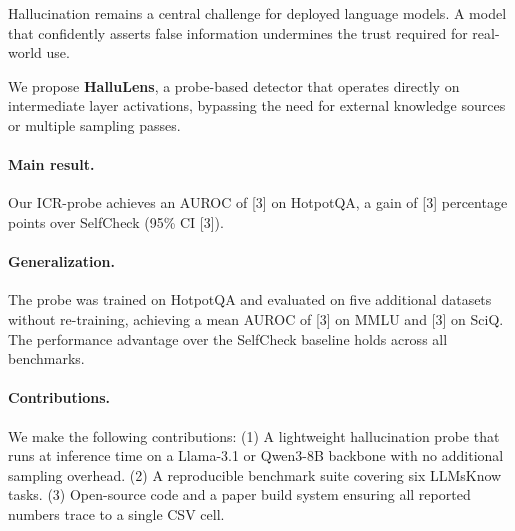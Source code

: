
Hallucination remains a central challenge for deployed language models.
A model that confidently asserts false information undermines the trust
required for real-world use.

We propose \textbf{HalluLens}, a probe-based detector that operates directly
on intermediate layer activations, bypassing the need for external knowledge
sources or multiple sampling passes.

\paragraph{Main result.}
Our ICR-probe achieves an AUROC of
[3]
on HotpotQA, a gain of
[3]
percentage points over SelfCheck (95\% CI
[3]).

\paragraph{Generalization.}
The probe was trained on HotpotQA and evaluated on five additional datasets
without re-training, achieving a mean AUROC of
[3]
on MMLU and
[3]
on SciQ.
The performance advantage over the SelfCheck baseline
holds across all benchmarks.

\paragraph{Contributions.}
We make the following contributions:
(1) A lightweight hallucination probe that runs at inference time on a
    Llama-3.1 or Qwen3-8B backbone with no additional sampling overhead.
(2) A reproducible benchmark suite covering six LLMsKnow tasks.
(3) Open-source code and a paper build system ensuring all reported numbers
    trace to a single CSV cell.
